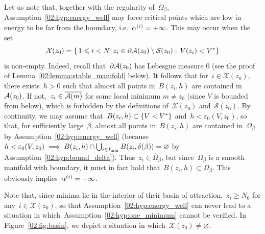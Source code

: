     \begin{remark}
        \label{02:rem:non_ssp}
            Let us note that, together with the regularity of~$\Omega_\beta$, Assumption~\eqref{02:hyp:energy_well} may force critical points which are low in energy to be far from the boundary, i.e.~$\alpha^{(i)}=+\infty$. This may occur when the set
    \begin{equation}
        \label{02:eq:non_removable_points}
        \mathcal X(z_0) = \left\{\,1\leqslant i < N\middle|\,z_i\in\partial\mathcal{A}(z_0)\setminus \mathcal{S}(z_0):\,V(z_i) < V^*\right\}
    \end{equation}
    is non-empty.
    Indeed, recall that~$\partial \mathcal{A}(z_0)$ has Lebesgue measure 0 (see the proof of Lemma~\ref{02:lemma:stable_manifold} below). It follows that for~$i\in\mathcal X(z_0)$, there exists~$h>0$ such that almost all points in~$B(z_i,h)$ are contained in~$\mathcal{A}(z_0)$. If not,~$z_i\in\overline{\mathcal{A}(m)}$ for some local minimum $m\neq z_0$ (since $V$ is bounded from below), which is forbidden by the definitions of~$\mathcal X(z_0)$ and~$\mathcal S(z_0)$. By continuity, we may assume that~$B(z_i,h)\subset\{V<V^*\}$ and~$h<\varepsilon_0(V,z_0)$, so that, for sufficiently large~$\beta$, almost all points in~$B(z_i,h)$ are contained in~$\Omega_\beta$ by Assumption~\eqref{02:hyp:energy_well} (because~$h<\varepsilon_0(V,z_0) \implies B(z_i,h) \cap\bigcup_{i\in I_{\min}} B(z_i,\delta(\beta))=\varnothing$ by Assumption~\eqref{02:hyp:bound_delta}). Thus~$z_i\in\overline{\Omega}_\beta$, but since~$\Omega_\beta$ is a smooth manifold with boundary, it must in fact hold that~$B(z_i,h)\subset \Omega_\beta$. This obviously implies~$\alpha^{(i)}=+\infty$.
    
    Note that, since minima lie in the interior of their basin of attraction,~$z_i\geq N_0$ for any~$i\in\mathcal X(z_0)$, so that Assumption~\eqref{02:hyp:energy_well} can never lead to a situation in which~Assumption~\eqref{02:hyp:one_minimum} cannot be verified.
    In Figure~\ref{02:fig:basin}, we depict a situation in which~$\mathcal X(z_0)\neq\varnothing$.
    \end{remark}


